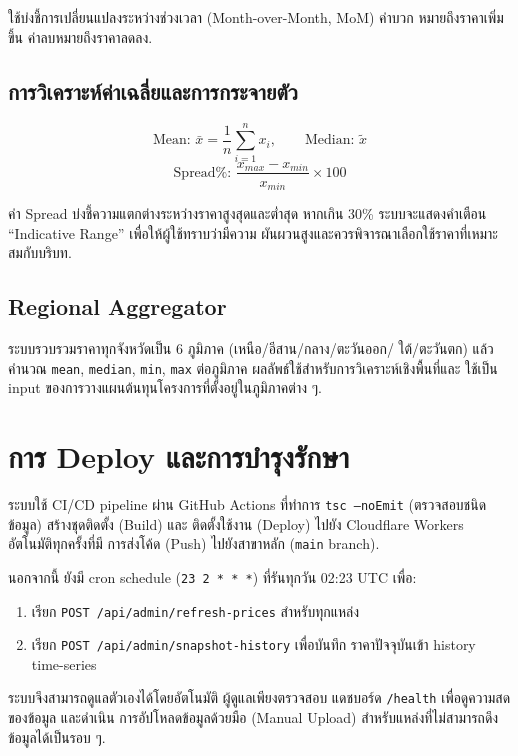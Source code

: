 ใช้บ่งชี้การเปลี่ยนแปลงระหว่างช่วงเวลา (Month-over-Month, MoM) ค่าบวก
หมายถึงราคาเพิ่มขึ้น ค่าลบหมายถึงราคาลดลง.

\subsection{การวิเคราะห์ค่าเฉลี่ยและการกระจายตัว}

\begin{equation}
\text{Mean: } \bar{x} = \frac{1}{n}\sum_{i=1}^{n} x_i,
\qquad \text{Median: } \tilde{x}
\end{equation}
\begin{equation}
\text{Spread\%: } \frac{x_{max} - x_{min}}{x_{min}} \times 100
\end{equation}

ค่า Spread บ่งชี้ความแตกต่างระหว่างราคาสูงสุดและต่ำสุด หากเกิน 30\%
ระบบจะแสดงคำเตือน ``Indicative Range'' เพื่อให้ผู้ใช้ทราบว่ามีความ
ผันผวนสูงและควรพิจารณาเลือกใช้ราคาที่เหมาะสมกับบริบท.

\subsection{Regional Aggregator}

ระบบรวบรวมราคาทุกจังหวัดเป็น 6 ภูมิภาค (เหนือ/อีสาน/กลาง/ตะวันออก/
ใต้/ตะวันตก) แล้วคำนวณ \texttt{mean}, \texttt{median}, \texttt{min},
\texttt{max} ต่อภูมิภาค ผลลัพธ์ใช้สำหรับการวิเคราะห์เชิงพื้นที่และ
ใช้เป็น input ของการวางแผนต้นทุนโครงการที่ตั้งอยู่ในภูมิภาคต่าง ๆ.

\section{การ Deploy และการบำรุงรักษา}
\label{sec:deploy}

ระบบใช้ CI/CD pipeline ผ่าน GitHub Actions ที่ทำการ
\texttt{tsc --noEmit} (ตรวจสอบชนิดข้อมูล) สร้างชุดติดตั้ง (Build) และ
ติดตั้งใช้งาน (Deploy) ไปยัง Cloudflare Workers อัตโนมัติทุกครั้งที่มี
การส่งโค้ด (Push) ไปยังสาขาหลัก (\texttt{main} branch).

นอกจากนี้ ยังมี cron schedule (\texttt{23 2 * * *}) ที่รันทุกวัน
02:23 UTC เพื่อ:
\begin{enumerate}[leftmargin=2em,itemsep=0.1em]
  \item เรียก \texttt{POST /api/admin/refresh-prices} สำหรับทุกแหล่ง
  \item เรียก \texttt{POST /api/admin/snapshot-history} เพื่อบันทึก
        ราคาปัจจุบันเข้า history time-series
\end{enumerate}

ระบบจึงสามารถดูแลตัวเองได้โดยอัตโนมัติ ผู้ดูแลเพียงตรวจสอบ
แดชบอร์ด \texttt{/health} เพื่อดูความสดของข้อมูล และดำเนิน
การอัปโหลดข้อมูลด้วยมือ (Manual Upload) สำหรับแหล่งที่ไม่สามารถดึง
ข้อมูลได้เป็นรอบ ๆ.
